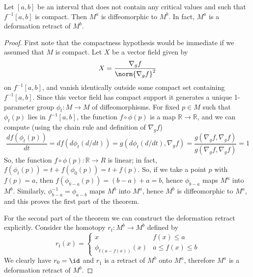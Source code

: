 \begin{thm}
Let $[a,b]$ be an interval that does not contain any critical values and such that $f^{-1}[a,b]$ is compact. Then $M^a$ is diffeomorphic to $M^b$. In fact, $M^a$ is a deformation retract of $M^b$.
\end{thm}
\begin{proof}
First note that the compactness hypothesis would be immediate if we assumed that $M$ is compact. Let $X$ be a vector field given by
\[ X = \frac{\nabla_g f}{\norm{\nabla_g f}^2} \]
on $f^{-1}[a,b]$, and vanish identically outside some compact set containing $f^{-1}[a,b]$. Since this vector field has compact support it generates a unique 1-parameter group $\phi_t : M \rightarrow M$ of diffeomorphisms. For fixed $p \in M$ such that $\phi_t(p)$ lies in $f^{-1}[a,b]$, the function $f \circ \phi(p)$ is a map $\mathbb R \rightarrow \mathbb R$, and we can compute (using the chain rule and definition of $\nabla_g f$)
\[ \frac{d f(\phi_t(p))}{dt} = df(d\phi_t(d/dt)) = g(d\phi_t(d/dt),\nabla_g f) = \frac{g(\nabla_g f,\nabla_g f)}{g(\nabla_g f,\nabla_g f)} = 1 \]
So, the function $f \circ \phi(p) : \mathbb R \rightarrow R$ is linear; in fact, $f(\phi_t(p)) = t + f(\phi_0(p)) = t+f(p)$. So, if we take a point $p$ with $f(p) = a$, then $f(\phi_{b-a}(p)) = (b-a)+a=b$, hence $\phi_{b-a}$ maps $M^a$ into $M^b$. Similarly, $\phi_{b-a}^{-1} = \phi_{a-b}$ maps $M^b$ into $M^a$, hence $M^b$ is diffeomorphic to $M^a$, and this proves the first part of the theorem.

For the second part of the theorem we can construct the deformation retract explicitly. Consider the homotopy $r_t : M^b \rightarrow M^b$ defined by
\[ r_t(x) = \begin{cases} x & f(x) \leq a \\ \phi_{t(a-f(x))} (x) & a \leq f(x) \leq b \end{cases} \]
We clearly have $r_0 = \id$ and $r_1$ is a retract of $M^b$ onto $M^a$, therefore $M^a$ is a deformation retract of $M^b$.
\end{proof}


